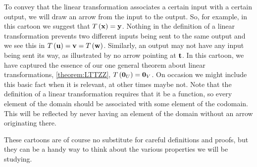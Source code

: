 \documentclass{ximera}
\begin{document}
To convey that the linear transformation associates a certain input
with a certain output, we will draw an arrow from the input to the
output.  So, for example, in this cartoon we suggest that
$T\left(\mathbf{x}\right)=\mathbf{y}$.  Nothing in the definition of a linear
transformation prevents two different inputs being sent to the same
output and we see this in
$T\left(\mathbf{u}\right)=\mathbf{v}=T\left(\mathbf{w}\right)$.  Similarly, an output
may not have any input being sent its way, as illustrated by no arrow
pointing at $\mathbf{t}$.  In this cartoon, we have captured the essence
of our one general theorem about linear transformations,
\ref{theorem:LTTZZ}, $T\left(\mathbf{0}_U\right)=\mathbf{0}_V$.  On
occasion we might include this basic fact when it is relevant, at
other times maybe not.  Note that the definition of a linear
transformation requires that it be a function, so every element of the
domain should be associated with some element of the codomain.  This
will be reflected by never having an element of the domain without an
arrow originating there.

These cartoons are of course no substitute for careful definitions and
proofs, but they can be a handy way to think about the various
properties we will be studying.
\end{document}
